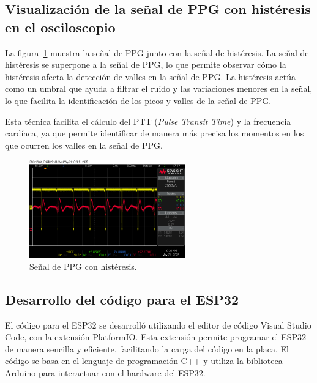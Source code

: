     \subsection{Visualización de la señal de PPG con histéresis en el osciloscopio} 

    La figura~\ref{fig:PPGconHisteresis} muestra la señal de PPG junto con la señal de histéresis. La señal de histéresis se superpone a la señal de PPG, lo que permite observar cómo la histéresis afecta la detección de valles en la señal de PPG. La histéresis actúa como un umbral que ayuda a filtrar el ruido y las variaciones menores en la señal, lo que facilita la identificación de los picos y valles de la señal de PPG.

    Esta técnica facilita el cálculo del PTT (\textit{Pulse Transit Time}) y la frecuencia cardíaca, ya que permite identificar de manera más precisa los momentos en los que ocurren los valles en la señal de PPG.

    \begin{figure}[H]
        \centering
        \includegraphics[width=0.6\textwidth]{img/Desarrollo/histeresisPPG.png}
        \caption[Señal de PPG con histéresis.]{Señal de PPG con histéresis.\footnotemark}
        \label{fig:PPGconHisteresis}
    \end{figure}

    \subsection{Desarrollo del código para el ESP32}
    El código para el ESP32 se desarrolló utilizando el editor de código Visual Studio Code, con la extensión PlatformIO. Esta extensión permite programar el ESP32 de manera sencilla y eficiente, facilitando la carga del código en la placa. El código se basa en el lenguaje de programación C++ y utiliza la biblioteca Arduino para interactuar con el hardware del ESP32.

